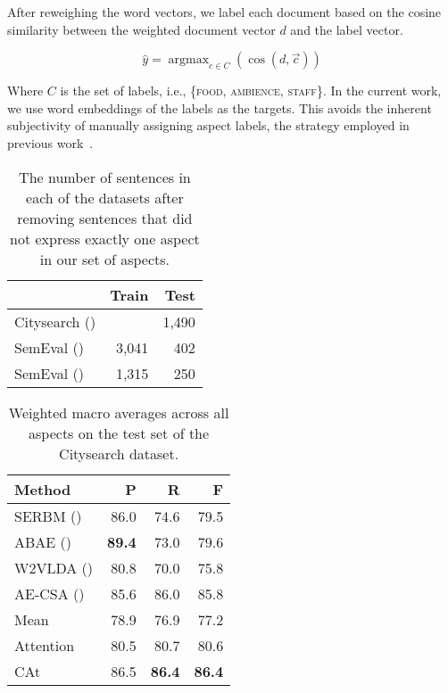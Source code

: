\documentclass[11pt,a4paper]{article}
\newlength{\catheight}
\newcommand{\ourmodel}{CAt~\raisebox{-0.1ex}{\texttt{[image: fig/cat]}}} \definecolor{aspectcolor}{HTML}{fb7e5e}
\DeclareMathOperator*{\argmax}{argmax}
\begin{document}
After reweighing the word vectors, we label each document based on the cosine similarity between the weighted document vector $d$
and the label vector.

\begin{equation}\label{eq:labeling}
    \hat y = \argmax_{c \in C}(\cos(d, \vec{c}))
\end{equation}

Where $C$ is the set of labels, i.e., \{\textsc{food}, \textsc{ambience}, \textsc{staff}\}.
In the current work, we use word embeddings of the labels as the targets.
This avoids the inherent subjectivity
of manually assigning aspect labels,
the strategy employed in previous work~\citep{he2017unsupervised,luo2019unsupervised}.

\begin{table}[t]\centering
\begin{tabular}{lrr}  & \textbf{Train} & \textbf{Test}  \\ \midrule
Citysearch (\citeyear{ganu2009beyond})  &       & 1,490 \\
SemEval (\citeyear{pontiki2014semeval}) & 3,041 &   402 \\
SemEval (\citeyear{pontiki2015semeval}) & 1,315 &   250 \\
\end{tabular}
\caption{The number of sentences in each of the datasets after removing sentences that did not express exactly one aspect in our set of aspects.}\label{tab:corpora}
\end{table}

\begin{table}[t]\centering
\begin{tabular}{lrrr}
\textbf{Method} & \textbf{P} & \textbf{R} & \textbf{F} \\ \midrule
SERBM (\citeyear{wang2015sentiment})    & 86.0  & 74.6  & 79.5  \\
ABAE (\citeyear{he2017unsupervised})    & \textbf{89.4}  & 73.0  & 79.6  \\
W2VLDA (\citeyear{garcia2018w2vlda})    & 80.8  & 70.0  & 75.8  \\
AE-CSA (\citeyear{luo2019unsupervised}) & 85.6  & 86.0  & 85.8 \\
Mean      & 78.9  & 76.9  & 77.2  \\
Attention & 80.5  & 80.7  & 80.6  \\
\ourmodel & 86.5  & \textbf{86.4}  & \textbf{86.4}
\end{tabular}
\caption{Weighted macro averages across all aspects on the test set of the Citysearch dataset.}\label{tblresultsmacro}
\end{table}
\end{document}
